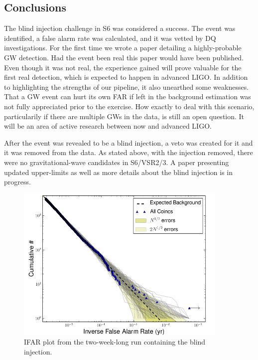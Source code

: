 \subsection{Conclusions}

The blind injection challenge in S6 was considered a success. The event was identified, a false alarm rate was calculated, and it was vetted by \ac{DQ} investigations. For the first time we wrote a paper detailing a highly-probable \ac{GW} detection. Had the event been real this paper would have been published. Even though it was not real, the experience gained will prove valuable for the first real detection, which is expected to happen in  advanced LIGO. In addition to highlighting the strengths of our pipeline, it also unearthed some weaknesses. That a \ac{GW} event can hurt its own \ac{FAR} if left in the background estimation was not fully appreciated prior to the exercise. How exactly to deal with this scenario, particularily if there are multiple \acp{GW} in the data, is still an open question. It will be an area of active research between now and advanced LIGO.

After the event was revealed to be a blind injection, a veto was created for it and it was removed from the data. As stated above, with the injection removed, there were no gravitational-wave candidates in S6/VSR2/3. A paper presenting updated upper-limits as well as more details about the blind injection is in progress.

\begin{figure}[p]
\label{fig:big_dog-ifar}
\center
\includegraphics[width=4in]{figures/big_dog/H1L1V1-ligolw_cbc_plotifar_FULL_DATA_CAT_4_VETO_cumhist_combined_ifar_ALL_DATA_PLOTTED_OPEN_BOX-967593543-1209744.png}
\caption{IFAR plot from the two-week-long \ihope run containing the blind injection.}
\end{figure}


